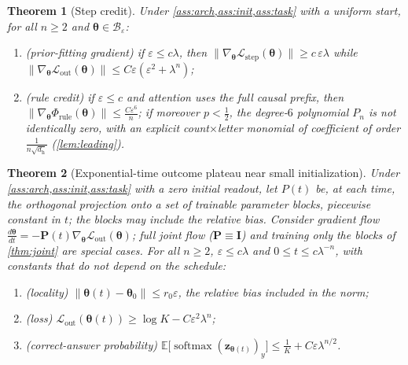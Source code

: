 \documentclass[11pt]{article}
\newtheorem{theorem}{Theorem}
\theoremstyle{definition}
\theoremstyle{remark}
\newcommand{\E}{\mathbb E}
\newcommand{\softmax}{\operatorname{softmax}}
\newcommand{\Lout}{\mathcal L_{\mathrm{out}}}
\newcommand{\Lstep}{\mathcal L_{\mathrm{step}}}
\newcommand{\cred}{\Phi}
\newcommand{\rulecredit}{\cred_{\mathrm{rule}}}
\newcommand{\initscale}{\varepsilon}
\newcommand{\ballradius}{r_0}
\newcommand{\mixrate}{\lambda}
\newcommand{\initball}{\mathcal B_{\initscale}}
\begin{document}
\begin{theorem}[Step credit]
\label{thm:separation}
Under \cref{ass:arch,ass:init,ass:task} with a uniform start, for all $n\ge2$ and $\bm\theta\in\initball$:
\begin{enumerate}[label=(\roman*),leftmargin=*,itemsep=0pt,topsep=2pt]
\item \emph{(prior-fitting gradient)} if $\initscale\le c\mixrate$, then $\|\nabla_{\bm\theta}\Lstep(\bm\theta)\|\ge c\,\initscale\mixrate$ while
$\|\nabla_{\bm\theta}\Lout(\bm\theta)\|\le C\initscale(\initscale^2+\mixrate^n)$;
\item \emph{(rule credit)} if $\initscale\le c$ and attention uses the full causal prefix, then $\|\nabla_{\bm\theta}\rulecredit(\bm\theta)\|\le \frac{C\initscale^6}{n}$; if
moreover $p<\tfrac{1}{2}$, the degree-$6$ polynomial $P_n$ is not identically zero, with an explicit count$\times$letter monomial of
coefficient of order $\frac{1}{n\sqrt{d_{\mathrm h}}}$
(\cref{lem:leading}).
\end{enumerate}
\end{theorem}

\begin{theorem}[Exponential-time outcome plateau near small initialization]
\label{thm:outcome-end}
Under \cref{ass:arch,ass:init,ass:task} with a zero initial readout, let $P(t)$ be, at each time, the orthogonal projection onto a set
of trainable parameter blocks, piecewise constant in $t$; the blocks may include the relative bias. Consider gradient flow
$\tfrac{d\bm\theta}{dt}=-\mathbf P(t)\nabla_{\bm\theta}\Lout(\bm\theta)$; full joint flow ($\mathbf P\equiv\mathbf I$) and training only the blocks of \cref{thm:joint} are special cases.
For all $n\ge2$, $\initscale\le c\mixrate$ and $0\le t\le c\mixrate^{-n}$, with constants that do not depend on the schedule:
\begin{enumerate}[label=(\roman*),leftmargin=*,itemsep=0pt,topsep=2pt]
\item \emph{(locality)} $\|\bm\theta(t)-\bm\theta_0\|\le\ballradius\initscale$, the relative bias included in the norm;
\item \emph{(loss)} $\Lout(\bm\theta(t))\ge\log K-C\initscale^2\mixrate^n$;
\item \emph{(correct-answer probability)} $\E\bigl[\softmax(\bm z_{\bm\theta(t)})_y\bigr]\le\frac{1}{K}+C\initscale\mixrate^{n/2}$.
\end{enumerate}
\end{theorem}
\end{document}
